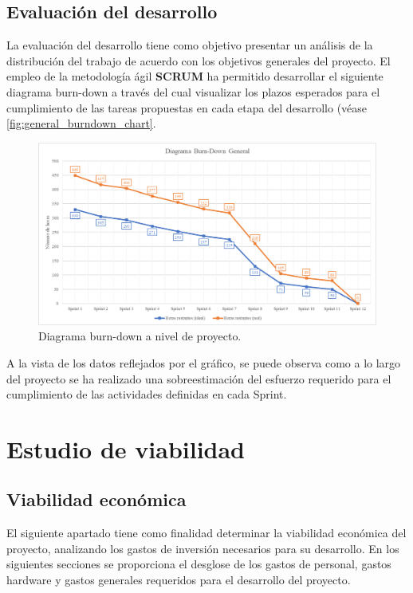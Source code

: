 \subsection{Evaluación del desarrollo}

La evaluación del desarrollo tiene como objetivo presentar un análisis de la distribución del trabajo de acuerdo con los objetivos generales del proyecto. El empleo de la metodología ágil \textbf{SCRUM} ha permitido desarrollar el siguiente diagrama burn-down a través del cual visualizar los plazos esperados para el cumplimiento de las tareas propuestas en cada etapa del desarrollo (véase \autoref{fig:general_burndown_chart}.

\begin{figure}[!ht]
	\centering
    \includegraphics[width=\textwidth]{img/general_burndown_chartpng.png}
	\caption{Diagrama burn-down a nivel de proyecto.}
	\label{fig:general_burndown_chart}
\end{figure}

A la vista de los datos reflejados por el gráfico, se puede observa como a lo largo del proyecto se ha realizado una sobreestimación del esfuerzo requerido para el cumplimiento de las actividades definidas en cada Sprint.

\section{Estudio de viabilidad}

\subsection{Viabilidad económica}

El siguiente apartado tiene como finalidad determinar la viabilidad económica del proyecto, analizando los gastos de inversión necesarios para su desarrollo. En los siguientes secciones se proporciona el desglose de los gastos de personal, gastos hardware y gastos generales requeridos para el desarrollo del proyecto.

